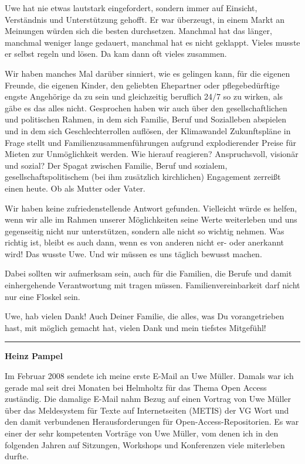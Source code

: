 \documentclass[a4paper,
fontsize=11pt,
oneside,
numbers=noperiodatend,
parskip=half-,
bibliography=totoc,
final
]{scrartcl}
\begin{document}
Uwe hat nie etwas lautstark eingefordert, sondern immer auf Einsicht,
Verständnis und Unterstützung gehofft. Er war überzeugt, in einem Markt
an Meinungen würden sich die besten durchsetzen. Manchmal hat das
länger, manchmal weniger lange gedauert, manchmal hat es nicht geklappt.
Vieles musste er selbst regeln und lösen. Da kam dann oft vieles
zusammen.

Wir haben manches Mal darüber sinniert, wie es gelingen kann, für die
eigenen Freunde, die eigenen Kinder, den geliebten Ehepartner oder
pflegebedürftige engste Angehörige da zu sein und gleichzeitig beruflich
24/7 so zu wirken, als gäbe es das alles nicht. Gesprochen haben wir
auch über den gesellschaftlichen und politischen Rahmen, in dem sich
Familie, Beruf und Sozialleben abspielen und in dem sich
Geschlechterrollen auflösen, der Klimawandel Zukunftspläne in Frage
stellt und Familienzusammenführungen aufgrund explodierender Preise für
Mieten zur Unmöglichkeit werden. Wie hierauf reagieren? Anspruchsvoll,
visionär und sozial? Der Spagat zwischen Familie, Beruf und sozialem,
gesellschaftspolitischem (bei ihm zusätzlich kirchlichen) Engagement
zerreißt einen heute. Ob als Mutter oder Vater.

Wir haben keine zufriedenstellende Antwort gefunden. Vielleicht würde es
helfen, wenn wir alle im Rahmen unserer Möglichkeiten seine Werte
weiterleben und uns gegenseitig nicht nur unterstützen, sondern alle
nicht so wichtig nehmen. Was richtig ist, bleibt es auch dann, wenn es
von anderen nicht er- oder anerkannt wird! Das wusste Uwe. Und wir
müssen es uns täglich bewusst machen.

Dabei sollten wir aufmerksam sein, auch für die Familien, die Berufe und
damit einhergehende Verantwortung mit tragen müssen.
Familienvereinbarkeit darf nicht nur eine Floskel sein.

Uwe, hab vielen Dank! Auch Deiner Familie, die alles, was Du
vorangetrieben hast, mit möglich gemacht hat, vielen Dank und mein
tiefstes Mitgefühl!

\begin{center}\rule{0.5\linewidth}{0.5pt}\end{center}

\textbf{Heinz Pampel}

Im Februar 2008 sendete ich meine erste E-Mail an Uwe Müller. Damals war
ich gerade mal seit drei Monaten bei Helmholtz für das Thema Open Access
zuständig. Die damalige E-Mail nahm Bezug auf einen Vortrag von Uwe
Müller über das Meldesystem für Texte auf Internetseiten (METIS) der VG
Wort und den damit verbundenen Herausforderungen für
Open-Access-Repositorien. Es war einer der sehr kompetenten Vorträge von
Uwe Müller, vom denen ich in den folgenden Jahren auf Sitzungen,
Workshops und Konferenzen viele miterleben durfte.
\end{document}
